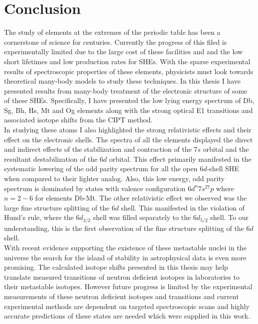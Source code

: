 \documentclass[10pt,a4paper, twoside, openright]{report}
\begin{document}
\chapter{Conclusion} \label{chap:P2Conc}
The study of elements at the extremes of the periodic table has been a cornerstone of science for centuries. Currently the progress of this filed is experimentally limited due to the large cost of these facilities and and the low short lifetimes and low production rates for SHEs. With the sparse experimental results of spectroscopic properties of these elements, physicists must look towards theoretical many-body models to study these techniques. In this thesis I have presented results from many-body treatment of the electronic structure of some of these SHEs. Specifically, I have presented the low lying energy spectrum of Db, Sg, Bh, Hs, Mt and Og elements along with the strong optical E1 transitions and associated isotope shifts from the CIPT method. \\
\linebreak
In studying these atoms I also highlighted the strong relativistic effects and their effect on the electronic shells. The spectra of all the elements displayed the direct and indirect effects of the stabilization and contraction of the $7s$ orbital and the resultant destabilization of the $6d$ orbital. This effect primarily manifested in the systematic lowering of the odd parity spectrum for all the open $6d$-shell SHE when compared to their lighter analog. Also, this low energy, odd parity spectrum is dominated by states with valence configuration $6d^{n}7s^27p$ where $n=2-6$ for elements Db-Mt. The other relativistic effect we observed was the large fine structure splitting of the $6d$ shell. This manifested in the violation of Hund's rule, where the $6d_{3/2}$ shell was filled separately to the $6d_{5/2}$ shell. To our understanding, this is the first observation of the fine structure splitting of the $6d$ shell.\\
\linebreak
With recent evidence supporting the existence of these metastable nuclei in the universe \cite{Alexandrov2019} the search for the island of stability in astrophysical data is even more promising. The calculated isotope shifts presented in this thesis may help translate measured transitions of neutron deficient isotopes in laboratories to their metastable isotopes. However future progress is limited by the experimental measurements of these neutron deficient isotopes and transitions and current experimental methods are dependent on targeted spectroscopic scans and highly accurate predictions of these states are needed which were supplied in this work.\\
\end{document}
